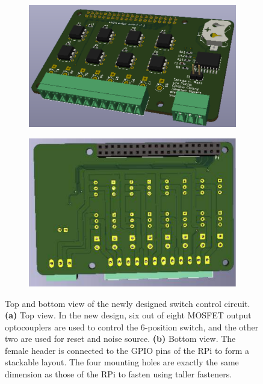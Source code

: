 \begin{figure}
	\centering
	\begin{subfigure}[t]{0.52\textwidth}
		\centering
		\includegraphics[width=\linewidth]{Figures/Top} 
		\caption{} \label{Fig:Top}
	\end{subfigure}
	\hfill
	\begin{subfigure}[t]{0.45\textwidth}
		\centering
		\includegraphics[width=\linewidth]{Figures/Bottom-compressed}
		\caption{} \label{Fig:Bottom}
	\end{subfigure}
	\caption{Top and bottom view of the newly designed switch control circuit. {\bf (a)} Top view. In the new design, six out of eight MOSFET output optocouplers are used to control the 6-position switch, and the other two are used for reset and noise source. {\bf (b)} Bottom view. The female header is connected to the GPIO pins of the RPi to form a stackable layout. The four mounting holes are exactly the same dimension as those of the RPi to fasten using taller fasteners.}
	\label{Fig:control}
\end{figure}

